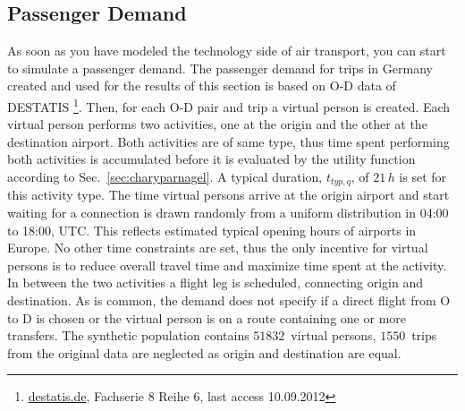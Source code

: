\subsection{Passenger Demand}


As soon as you have modeled the technology side of air transport, you can start to simulate a passenger demand. 
The passenger demand for trips in Germany created and used for the results of this section is based on O-D data of DESTATIS 
\footnote{\url{destatis.de}, Fachserie 8 Reihe 6, last access 10.09.2012}. 
Then, for each O-D pair and trip a virtual person is created.
Each virtual person performs two activities, one at the origin and the other at the destination airport. 
Both activities are of same type, thus time spent performing both activities is accumulated before it is evaluated by the utility function according to Sec.~\ref{sec:charyparnagel}. %
A typical duration, $t_{typ,q}$, of $21 \, h$ is set for this activity type. 
The time virtual persons arrive at the origin airport and start waiting for a connection is drawn randomly from a uniform distribution in 04:00 to 18:00, UTC. 
This reflects estimated typical opening hours of airports in Europe.
No other time constraints are set, thus the only incentive for virtual persons is to reduce overall travel time and maximize time spent at the activity. 
In between the two activities a flight leg is scheduled, connecting origin and destination.
As is common, the demand does not specify if a direct flight from O to D is chosen or the virtual person is on a route containing one or more transfers.
The synthetic population contains $51832$~virtual persons, $1550$~trips from the original data are neglected as origin and destination are equal. 
%

